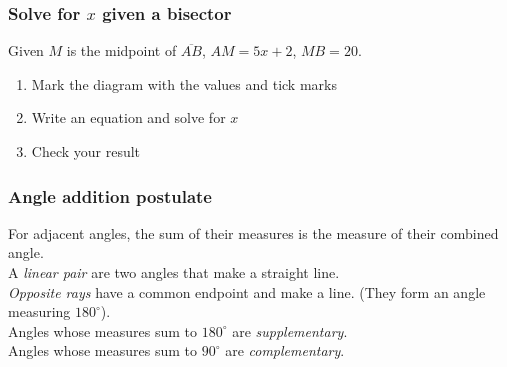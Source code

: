 \documentclass{beamer}
\begin{document}
  \frame
  {
    \frametitle{Solve for $x$ given a bisector}
    Given $M$ is the midpoint of $\overline{AB}$, $AM=5x+2$, $MB=20$.
    \begin{enumerate}
      \item Mark the diagram with the values and tick marks
      \item Write an equation and solve for $x$
      \item Check your result
    \end{enumerate} \vspace{1cm}
      \begin{center}
      \end{center} \vspace{4cm}
  }

  \frame
  {
    \frametitle{Angle addition postulate}
    For adjacent angles, the sum of their measures is the measure of their combined angle.\\
    A \emph{linear pair} are two angles that make a straight line. \\
    \emph{Opposite rays} have a common endpoint and make a line. (They form an angle measuring $180^\circ$).\\
    Angles whose measures sum to $180^\circ$ are \emph{supplementary}. \\
    Angles whose measures sum to $90^\circ$ are \emph{complementary}.
    \begin{center}
      \end{center}
  }
\end{document}
